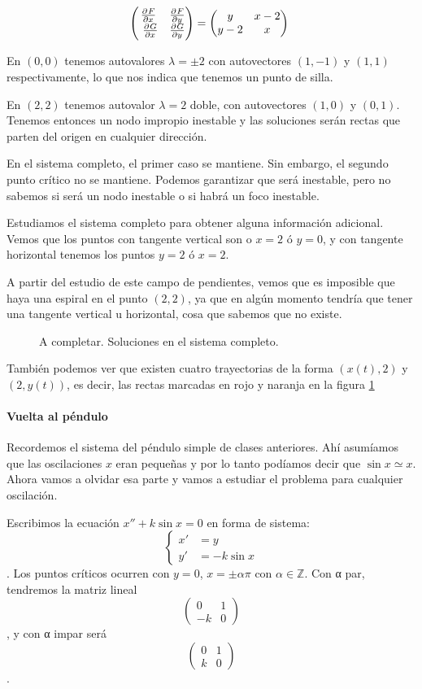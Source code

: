 \[ \begin{pmatrix}
\pd{F}{x} & \pd{F}{y} \\ \pd{G}{x} & \pd{G}{y}
\end{pmatrix} = \begin{pmatrix}
y & x- 2 \\ y -2 & x \end{pmatrix} \]

En $(0,0)$ tenemos autovalores $λ=\pm 2$ con autovectores $(1,-1)$ y $(1,1)$ respectivamente, lo que nos indica que tenemos un punto de silla.

En $(2,2)$ tenemos autovalor $λ=2$ doble, con autovectores $(1,0)$ y $(0,1)$. Tenemos entonces un nodo impropio inestable y las soluciones serán rectas que parten del origen en cualquier dirección.

En el sistema completo, el primer caso se mantiene. Sin embargo, el segundo punto crítico no se mantiene. Podemos garantizar que será inestable, pero no sabemos si será un nodo inestable o si habrá un foco inestable.

Estudiamos el sistema completo para obtener alguna información adicional. Vemos que los puntos con tangente vertical son o $x=2$ ó $y=0$, y con tangente horizontal tenemos los puntos $y=2$ ó $x=2$.

A partir del estudio de este campo de pendientes, vemos que es imposible que haya una espiral en el punto $(2,2)$, ya que en algún momento tendría que tener una tangente vertical u horizontal, cosa que sabemos que no existe.

\begin{figure}[hbtp]
\label{img8-Ej2}
\caption{A completar. Soluciones en el sistema completo.}
\end{figure}

También podemos ver que existen cuatro trayectorias de la forma $(x(t), 2)$ y $(2,y(t))$, es decir, las rectas marcadas en rojo y naranja en la figura \ref{img8-Ej2}

\paragraph{Vuelta al péndulo} Recordemos el sistema del péndulo simple de clases anteriores. Ahí asumíamos que las oscilaciones $x$ eran pequeñas y por lo tanto podíamos decir que $\sin x \simeq x$. Ahora vamos a olvidar esa parte y vamos a estudiar el problema para cualquier oscilación.

Escribimos la ecuación $x'' + k\sin x = 0$ en forma de sistema: \[ \begin{cases} x' &= y \\ y' &= -k \sin x \end{cases} \]. Los puntos críticos ocurren con $y=0$, $x = \pm α π$ con $α∈ℤ$. Con α par, tendremos la matriz lineal \[ \begin{pmatrix} 0 & 1 \\ -k & 0\end{pmatrix} \], y con α impar será \[ \begin{pmatrix} 0 & 1 \\ k  & 0 \end{pmatrix} \].

